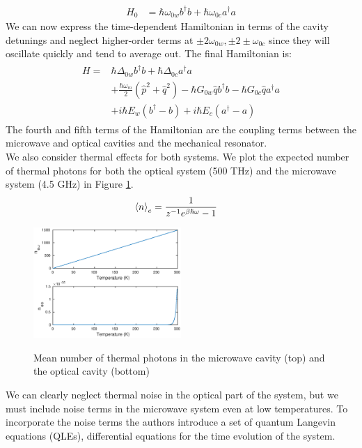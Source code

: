 \documentclass[a4paper,10pt,twocolumn]{article}
\numberwithin{equation}{section}
\begin{document}
\begin{align}
 H_0 &= \hbar\omega_{0w}b^\dagger b +\hbar\omega_{0c}a^\dagger a
\end{align}
We can now express the time-dependent Hamiltonian in terms of the cavity detunings and neglect higher-order terms at $\pm2\omega_{0w},\pm2\pm\omega_{0c}$ since they will oscillate quickly and tend to average out.
The final Hamiltonian is:
\begin{align}
\begin{split}
 H = &\hbar\Delta_{0w}b^\dagger b+\hbar\Delta_{0c}a^\dagger a\\
     &+\frac{\hbar\omega_m}{2}(\hat{p}^2+\hat{q}^2)-\hbar G_{0w}\hat{q}b^\dagger b-\hbar G_{0c}\hat{q}a^\dagger a\\
     &+i\hbar E_w(b^\dagger -b)+i\hbar E_c(a^\dagger -a )
\end{split}
\end{align}
The fourth and fifth terms of the Hamiltonian are the coupling terms between the microwave and optical cavities and the mechanical resonator.\\ 
We also consider thermal effects for both systems. We plot the expected number of thermal photons for both the optical system (500 THz) and the microwave system (4.5 GHz) in Figure \ref{fig:thermalnoise}.
\begin{align}
 \braket{n}_e &= \frac{1}{z^{-1}e^{\beta \hbar \omega}-1}
\end{align}
\begin{figure}[ht]
 \caption{Mean number of thermal photons in the microwave cavity (top) and the optical cavity (bottom)}
 \centering
   \includegraphics[width=0.5\textwidth]{figs/ThermalPhotons}
 \label{fig:thermalnoise}
\end{figure}
We can clearly neglect thermal noise in the optical part of the system, but we must include noise terms in the microwave system even at low temperatures.
To incorporate the noise terms the authors introduce a set of quantum Langevin equations (QLEs), differential equations for the time evolution of the system.
\end{document}
